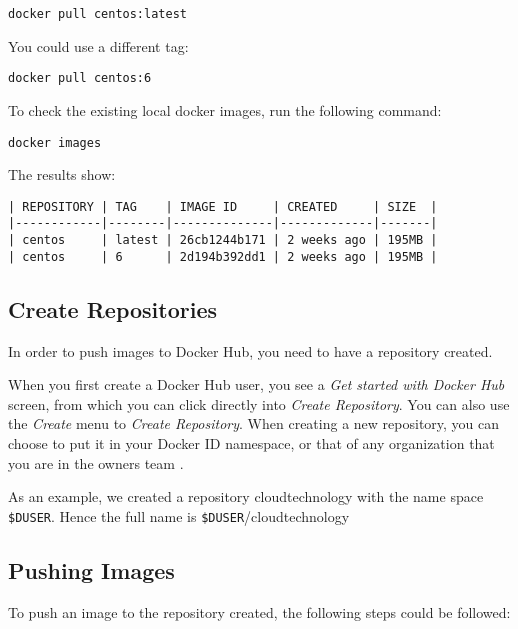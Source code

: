 \begin{lstlisting}
docker pull centos:latest
\end{lstlisting}

You could use a different tag:

\begin{lstlisting}
docker pull centos:6
\end{lstlisting}

To check the existing local docker images, run the following command:

\begin{lstlisting}
docker images
\end{lstlisting}

The results show:

\begin{lstlisting}
| REPOSITORY | TAG    | IMAGE ID     | CREATED     | SIZE  |
|------------|--------|--------------|-------------|-------|
| centos     | latest | 26cb1244b171 | 2 weeks ago | 195MB |
| centos     | 6      | 2d194b392dd1 | 2 weeks ago | 195MB |
\end{lstlisting}

\subsection{Create Repositories}

In order to push images to Docker Hub, you need to have a repository
created.

When you first create a Docker Hub user, you see a \emph{Get started
with Docker Hub} screen, from which you can click directly into
\emph{Create Repository}. You can also use the \emph{Create} menu to
\emph{Create Repository}. When creating a new repository, you can choose
to put it in your Docker ID namespace, or that of any organization that
you are in the owners team
\cite{hid-sp18-405-tutorial-dockerhub-repository}.

As an example, we created a repository cloudtechnology with the name
space \texttt{\$DUSER}. Hence the full name is
\texttt{\$DUSER}/cloudtechnology

\subsection{Pushing Images}

To push an image to the repository created, the following steps could be
followed:

